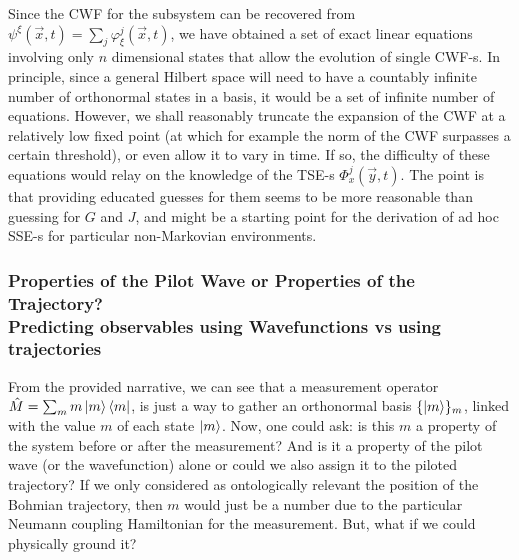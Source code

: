\documentclass[11pt, a4paper]{article} %
\begin{document}
Since the CWF for the subsystem can be recovered from $\psi^\xi(\vec{x},t)=\sum_j \varphi^j_\xi(\vec{x},t)$, we have obtained a set of exact linear equations involving only $n$ dimensional states that allow the evolution of single CWF-s. In principle, since a general Hilbert space will need to have a countably infinite number of orthonormal states in a basis, it would be a set of infinite number of equations. However, we shall reasonably truncate the expansion of the CWF at a relatively low fixed point (at which for example the norm of the CWF surpasses a certain threshold), or even allow it to vary in time. If so, the difficulty of these equations would relay on the knowledge of the TSE-s $\Phi^j_x(\vec{y},t)$. The point is that providing educated guesses for them seems to be more reasonable than guessing for $G$ and $J$, and might be a starting point for the derivation of ad hoc SSE-s for particular non-Markovian environments.  

 
\subsubsection*{Properties of the Pilot Wave or Properties of the Trajectory? \\ Predicting observables using Wavefunctions vs using trajectories}

From the provided narrative, we can see that a measurement operator $\hat{M}=\sum_m m\ket{m}\bra{m}$, is just a way to gather an orthonormal basis $\{\ket{m}\}_m$, linked with the value $m$ of each state $\ket{m}$. Now, one could ask: is this $m$ a property of the system before or after the measurement? And is it a property of the pilot wave (or the wavefunction) alone or could we also assign it to the piloted trajectory? If we only considered as ontologically relevant the position of the Bohmian trajectory, then $m$ would just be a number due to the particular Neumann coupling Hamiltonian for the measurement. But, what if we could physically ground it?
\end{document}
